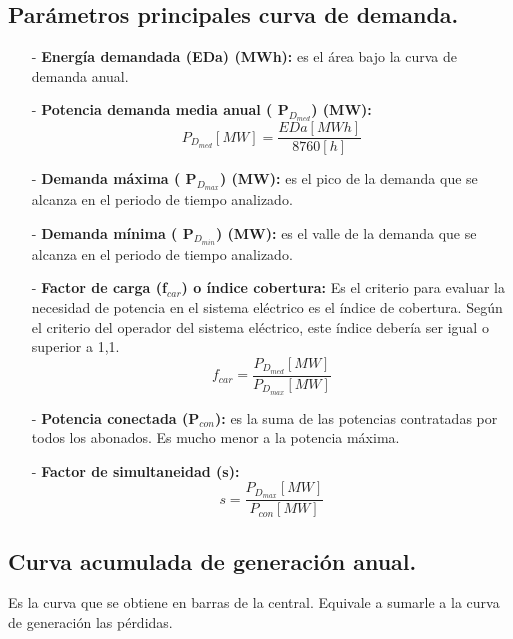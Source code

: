 \subsection{Parámetros principales curva de demanda.}
\begin{itemize}
	
	\item [-] \textbf{Energía demandada (EDa) (MWh):} es el área bajo la curva de demanda anual.
	\item [-] \textbf{Potencia demanda media anual ( P$_{D_{med}}$) (MW):} 
	\[P_{D_{med}}[MW]=\frac{EDa[MWh]}{8760[h]}\]
	\item [-] \textbf{Demanda máxima ( P$_{D_{max}}$) (MW):} es el pico de la demanda que se alcanza en el periodo de tiempo
	analizado.
	\item [-] \textbf{Demanda mínima ( P$_{D_{min}}$) (MW):} es el valle de la demanda que se alcanza en el periodo de tiempo
	analizado.
	\item [-] \textbf{Factor de carga (f$_{car}$) o índice cobertura:} Es el criterio para evaluar la necesidad de potencia en el sistema
	eléctrico es el índice de cobertura. Según el criterio del operador del sistema eléctrico, este índice
	debería ser igual o superior a 1,1.
	\[f_{car}=\frac{P_{D_{med}}[MW]}{P_{D_{max}}[MW]}\]
	\item [-] \textbf{Potencia conectada (P$_{con}$):} es la suma de las potencias contratadas por todos los abonados. Es mucho menor a la potencia máxima. 
	\item [-] \textbf{Factor de simultaneidad (s):} 
	\[s=\frac{P_{D_{max}}[MW]}{P_{con}[MW]}\]
\end{itemize}
\subsection{Curva acumulada de generación anual.}
Es la curva que se obtiene en barras de la central. Equivale a sumarle a la curva de generación las pérdidas.
